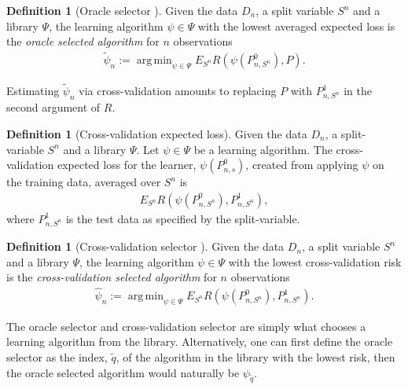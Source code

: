 \documentclass[11pt, a4paper]{article}
\DeclareMathOperator*{\argmin}{arg\,min}
\theoremstyle{definition}
\newtheorem{definition}[theorem]{Definition}
\theoremstyle{remark}
\newcommand{\q}{q}
\newcommand{\btheta}{\theta}
\newcommand{\la}{\psi}
\newcommand{\Sn}{S^n}
\newcommand{\lib}{\Psi}
\begin{document}
\begin{definition}[Oracle selector \parencite{laan03}]
    Given the data $ D_n $, a split variable $ \Sn $ and a library $ \lib $, the learning algorithm $ \la \in \lib $ with the lowest averaged expected loss is the \textit{oracle selected algorithm} for $ n $ observations
    \begin{align*}
        \tilde{\la}_n := \argmin_{\la \in \lib} E_{\Sn} R(\la(P_{n,\Sn}^0 ) , P).
    \end{align*}
\end{definition}
Estimating $ \tilde{\la}_n $ via cross-validation amounts to replacing $ P $ with $ P_{n, \Sn}^{1} $ in the second argument of $ R $.
\begin{definition}[Cross-validation expected loss]
     Given the data $D_n$, a split-variable $\Sn$ and a library $ \lib $. Let $ \la \in \lib $ be a learning algorithm. The cross-validation expected loss for the learner, $\la(P_{n,s}^0)$, created from applying $ \la $ on the training data, averaged over $ \Sn $ is  
    \begin{align*}
        E_{\Sn} R( \la(P_{n,\Sn}^{0}), P_{n, \Sn}^{1}),
    \end{align*}
    where $ P_{n,\Sn}^{1} $ is the test data as specified by the split-variable.
\end{definition}

\begin{definition}[Cross-validation selector \parencite{laan03}] \label{def:cvselector}
    Given the data $ D_n $, a split variable $ \Sn $ and a library $ \lib $, the learning algorithm $ \la \in \lib $ with the lowest cross-validation risk is the \textit{cross-validation selected algorithm} for $ n $ observations
    \begin{align*}
        \hat{\la}_n := \argmin_{\la \in \lib} E_{\Sn} R(\la(P_{n,\Sn}^0 ) , P_{n, \Sn}^{1}).
    \end{align*}
\end{definition}
%
The oracle selector and cross-validation selector are simply what chooses a learning algorithm from the library. Alternatively, one can first define the oracle selector as the index, $ \tilde{\q} $, of the algorithm in the library with the lowest risk, then the oracle selected algorithm would naturally be $ \la_{ \tilde{\q} } $. 
\end{document}
